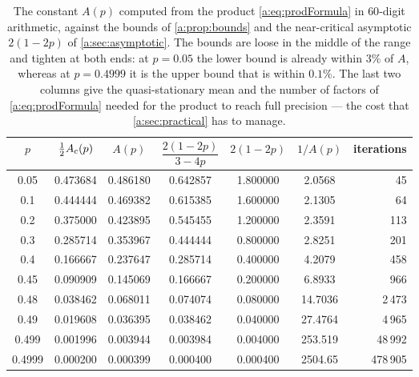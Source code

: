 \begin{table}[ht]
\centering
\caption{The constant $A(p)$ computed from the product \cref{a:eq:prodFormula} in
$60$-digit arithmetic, against the bounds of \cref{a:prop:bounds} and the
near-critical asymptotic $2(1-2p)$ of \cref{a:sec:asymptotic}. The bounds are loose
in the middle of the range and tighten at both ends: at $p=0.05$ the lower bound is
already within $3\%$ of $A$, whereas at $p=0.4999$ it is the upper bound that is
within $0.1\%$. The last two columns give the quasi-stationary mean and the number
of factors of \cref{a:eq:prodFormula} needed for the product to reach full precision
--- the cost that \cref{a:sec:practical} has to manage.}
\label{a:tab:Avals}
\begin{tabular}{ccccccr}
\toprule
$p$ & $\tfrac12A_{\mathrm{c}}(p)$ & $A(p)$ & $\dfrac{2(1-2p)}{3-4p}$ & $2(1-2p)$ & $1/A(p)$ & iterations\\
\midrule
0.05   & 0.473684 & 0.486180 & 0.642857 & 1.800000 & 2.0568 & 45 \\
0.1    & 0.444444 & 0.469382 & 0.615385 & 1.600000 & 2.1305 & 64 \\
0.2    & 0.375000 & 0.423895 & 0.545455 & 1.200000 & 2.3591 & 113 \\
0.3    & 0.285714 & 0.353967 & 0.444444 & 0.800000 & 2.8251 & 201 \\
0.4    & 0.166667 & 0.237647 & 0.285714 & 0.400000 & 4.2079 & 458 \\
0.45   & 0.090909 & 0.145069 & 0.166667 & 0.200000 & 6.8933 & 966 \\
0.48   & 0.038462 & 0.068011 & 0.074074 & 0.080000 & 14.7036 & 2\,473 \\
0.49   & 0.019608 & 0.036395 & 0.038462 & 0.040000 & 27.4764 & 4\,965 \\
0.499  & 0.001996 & 0.003944 & 0.003984 & 0.004000 & 253.519 & 48\,992 \\
0.4999 & 0.000200 & 0.000399 & 0.000400 & 0.000400 & 2504.65 & 478\,905 \\
\bottomrule
\end{tabular}
\end{table}

